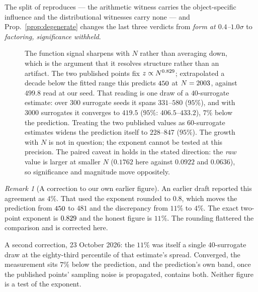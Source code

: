 \documentclass[11pt]{article}
\theoremstyle{remark}
\newtheorem{remark}{Remark}
\begin{document}
The split of \cite{ff06e} reproduces --- the arithmetic witness carries the
object-specific influence and the distributional witnesses carry none --- and
Prop.~\ref{prop:degenerate} changes the last three verdicts from \emph{form at
$0.4$--$1.0\sigma$} to \emph{factoring, significance withheld}.

\begin{figure}[ht]\centering
{}
\caption{The function signal sharpens with $N$ rather than averaging down, which is the
argument that it resolves structure rather than an artifact. The two published points
fix $z\propto N^{0.829}$; extrapolated a decade below the fitted range this predicts
$450$ at $N=2003$, against $499.8$ read at our seed. That reading is one draw
of a $40$-surrogate estimate: over $300$ surrogate seeds it spans $331$--$580$ ($95\%$), and
with $3000$ surrogates it converges to $419.5$ ($95\%$: $406.5$--$433.2$), $7\%$ below the
prediction. Treating the two published values as $60$-surrogate estimates widens the
prediction itself to $228$--$847$ ($95\%$). The growth with $N$ is not in question; the
exponent cannot be tested at this precision. The paired caveat in \cite{ff06e} holds in the
stated direction: the \emph{raw} value is larger at smaller $N$ ($0.1762$ here against
$0.0922$ and $0.0636$), so significance and magnitude move oppositely.}
\label{fig:ampl}
\end{figure}

\begin{remark}[A correction to our own earlier figure]
An earlier draft reported this agreement as $4\%$. That used the exponent rounded to
$0.8$, which moves the prediction from $450$ to $481$ and the discrepancy from
$11\%$ to $4\%$. The exact two-point exponent is $0.829$ and the honest figure is
$11\%$. The rounding flattered the comparison and is corrected here.

A second correction, 23 October 2026: the $11\%$ was itself a single $40$-surrogate draw
at the eighty-third percentile of that estimate's spread. Converged, the measurement sits
$7\%$ below the prediction, and the prediction's own band, once the published points'
sampling noise is propagated, contains both. Neither figure is a test of the exponent.
\end{remark}
\end{document}
